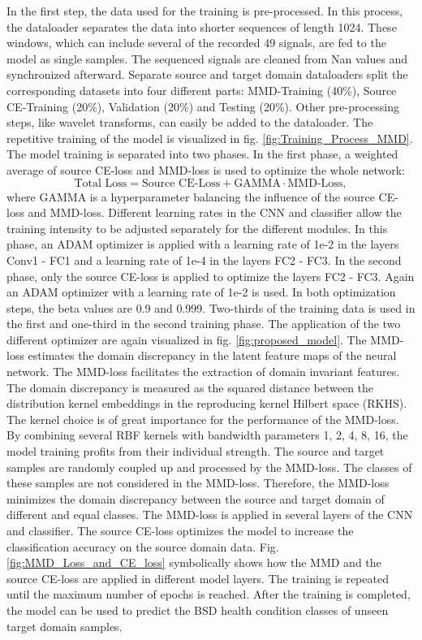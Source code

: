 In the first step, the data used for the training is pre-processed. In this process, the dataloader separates the data into shorter sequences of length 1024. These windows, which can include several of the recorded 49 signals, are fed to the model as single samples. The sequenced signals are cleaned from Nan values and synchronized afterward. Separate source and target domain dataloaders split the corresponding datasets into four different parts: MMD-Training (40\%), Source CE-Training (20\%), Validation (20\%) and Testing (20\%). Other pre-processing steps, like wavelet transforms, can easily be added to the dataloader. The repetitive training of the model is visualized in fig. \ref{fig:Training_Process_MMD}. The model training is separated into two phases. In the first phase, a weighted average of source CE-loss and MMD-loss is used to optimize the whole network: 
\begin{equation}
    \mbox{Total Loss} = \mbox{Source CE-Loss} + \mbox{GAMMA} \cdot \mbox{MMD-Loss}, 
\end{equation}
where GAMMA is a hyperparameter balancing the influence of the source CE-loss and MMD-loss. Different learning rates in the CNN and classifier allow the training intensity to be adjusted separately for the different modules. In this phase, an ADAM optimizer is applied with a learning rate of 1e-2 in the layers Conv1 - FC1 and a learning rate of 1e-4 in the layers FC2 - FC3. In the second phase, only the source CE-loss is applied to optimize the layers FC2 - FC3. Again an ADAM optimizer with a learning rate of 1e-2 is used. In both optimization steps, the beta values are 0.9 and 0.999. Two-thirds of the training data is used in the first and one-third in the second training phase. The application of the two different optimizer are again visualized in fig. \ref{fig:proposed_model}. The MMD-loss estimates the domain discrepancy in the latent feature maps of the neural network. The MMD-loss facilitates the extraction of domain invariant features. The domain discrepancy is measured as the squared distance between the distribution kernel embeddings in the reproducing kernel Hilbert space (RKHS). The kernel choice is of great importance for the performance of the MMD-loss. By combining several RBF kernels with bandwidth parameters 1, 2, 4, 8, 16, the model training profits from their individual strength. The source and target samples are randomly coupled up and processed by the MMD-loss. The classes of these samples are not considered in the MMD-loss. Therefore, the MMD-loss minimizes the domain discrepancy between the source and target domain of different and equal classes. The MMD-loss is applied in several layers of the CNN and classifier. The source CE-loss optimizes the model to increase the classification accuracy on the source domain data. Fig. \ref{fig:MMD_Loss_and_CE_loss} symbolically shows how the MMD and the source CE-loss are applied in different model layers. The training is repeated until the maximum number of epochs is reached. After the training is completed, the model can be used to predict the BSD health condition classes of unseen target domain samples. 



